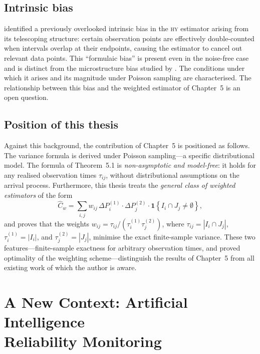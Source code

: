 \documentclass[reqno, 12pt]{amsart}
\newcommand{\tauij}{\tau_{ij}}
\newcommand{\HY}{\textsc{hy}}
\theoremstyle{plain}
\theoremstyle{definition}
\theoremstyle{remark}
\begin{document}
\subsection{Intrinsic bias}

\citet{georgiadis2024} identified a previously overlooked intrinsic
bias in the \HY{} estimator arising from its telescoping structure:
certain observation points are effectively double-counted when
intervals overlap at their endpoints, causing the estimator to cancel
out relevant data points. This ``formulaic bias'' is present even in
the noise-free case and is distinct from the microstructure bias
studied by \citet{griffin2011}. The conditions under which it arises
and its magnitude under Poisson sampling are characterised. The
relationship between this bias and the weighted estimator of Chapter~5
is an open question.

\subsection{Position of this thesis}

Against this background, the contribution of Chapter~5 is positioned
as follows. The \citeauthor{griffin2011} variance formula is derived
under Poisson sampling---a specific distributional model. The formula
of Theorem~5.1 is \emph{non-asymptotic and model-free}: it holds for
any realised observation times $\tauij$, without distributional
assumptions on the arrival process. Furthermore, this thesis treats
the \emph{general class of weighted estimators} of the form
\begin{equation}
  \widehat{C}_w = \sum_{i,j} w_{ij}\,
    \Delta P^{(1)}_i \cdot \Delta P^{(2)}_j
    \cdot \mathbf{1}\!\left\{I_i \cap J_j \neq \emptyset\right\},
\end{equation}
and proves that the weights $w_{ij} = \tauij/(\tau_i^{(1)}\tau_j^{(2)})$,
where $\tauij = |I_i \cap J_j|$, $\tau_i^{(1)} = |I_i|$,
and $\tau_j^{(2)} = |J_j|$, minimise the exact finite-sample variance.
These two features---finite-sample exactness for arbitrary observation
times, and proved optimality of the weighting scheme---distinguish the
results of Chapter~5 from all existing work of which the author is
aware.

\section{A New Context: Artificial Intelligence\\
Reliability Monitoring}
\label{sec:AI}
\end{document}
